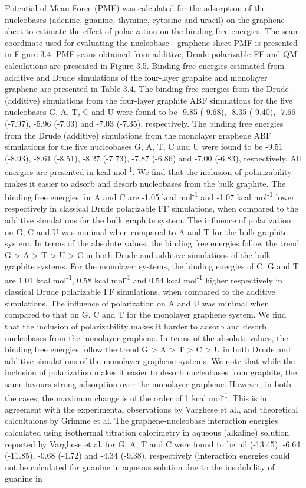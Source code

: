  Potential of Mean Force (PMF) was calculated for the adsorption of the nucleobases (adenine, guanine, thymine, cytosine and uracil) on the graphene sheet to estimate the effect of polarization on the binding free energies. The scan coordinate used for evaluating the nucleobase - graphene sheet PMF is presented in Figure 3.4.  PMF scans obtained from additive, Drude polarizable FF and QM calculations are presented in Figure 3.5. Binding free energies estimated from additive and Drude simulations of the four-layer graphite and monolayer graphene are presented in Table 3.4. The binding free energies from the Drude (additive) simulations from the four-layer graphite ABF simulations for the five nucleobases G, A, T, C and U were found to be -9.85 (-9.68), -8.35 (-9.40), -7.66 (-7.97), -5.96 (-7.03) and -7.03 (-7.35), respectively. The binding free energies from the Drude (additive) simulations from the monolayer graphene ABF simulations for the five nucleobases G, A, T, C and U were found to be -9.51 (-8.93), -8.61 (-8.51), -8.27 (-7.73), -7.87 (-6.86) and -7.00 (-6.83), respectively. All energies are presented in kcal mol\textsuperscript{-1}. We find that the inclusion of polarizability makes it easier to adsorb and desorb nucleobases from the bulk graphite. The binding free energies for A and C are -1.05 kcal mol\textsuperscript{-1} and -1.07 kcal mol\textsuperscript{-1} lower respectively in classical Drude polarizable FF simulations, when compared to the additive simulations for the bulk graphite system. The influence of polarization on G, C and U was minimal when compared to A and T for the bulk graphite system. In terms of the absolute values, the binding free energies follow the trend G > A > T > U > C in both Drude and additive simulations of the bulk graphite systems. For the monolayer systems, the binding energies of C, G and T are 1.01 kcal mol\textsuperscript{-1}, 0.58 kcal mol\textsuperscript{-1} and 0.54 kcal mol\textsuperscript{-1} higher respectively in classical Drude polarizable FF simulations, when compared to the additive simulations. The influence of polarization on A and U was minimal when compared to that on G, C and T for the monolayer graphene system. We find that the inclusion of polarizability makes it harder to adsorb and desorb nucleobases from the monolayer graphene. In terms of the absolute values, the binding free energies follow the trend G > A > T > C > U in both Drude and additive simulations of the monolayer graphene systems. We note that while the inclusion of polarization makes it easier to desorb nucleobases from graphite, the same favours strong adsorption over the monolayer graphene. However, in both the cases, the maximum change is of the order of 1 kcal mol\textsuperscript{-1}. This is in agreement with the experimental observations by Varghese et al.\supercite{varghese_binding_2009}, and theoretical calcultaions by Grimme et al.\supercite{antony_structures_2008} The graphene-nucleobase interaction energies calculated using isothermal titration calorimetry in aqueous (alkaline) solution reported by Varghese et al. for G, A, T and C were found to be nil (-13.45), -6.64 (-11.85), -0.68 (-4.72) and -4.34 (-9.38), respectively (interaction energies could not be calculated for guanine in aqueous solution due to the insolubility of guanine in 